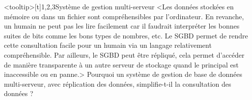 \begin{quiz}[title={Bases de données}]
\vspace{-\baselineskip}
\begin{quizquestion}<tooltip>[t]{1,2,3}{}{Système de gestion multi-serveur}
<Les données stockées en mémoire ou dans un fichier sont compréhensibles par l'ordinateur. En revanche, un humain ne peut pas les lire facilement car il faudrait interpréter les bonnes suites de bits comme les bons types de nombres, etc. Le SGBD permet de rendre cette consultation facile pour un humain via un langage relativement compréhensible.
Par ailleurs, le SGBD peut être répliqué, cela permet d'accéder de manière transparente à un autre serveur de stockage quand le principal est inaccessible ou en panne.>
Pourquoi un système de gestion de base de données multi-serveur, avec réplication des données, simplifie-t-il la consultation des données ? %
\end{quizquestion}
\end{quiz}
